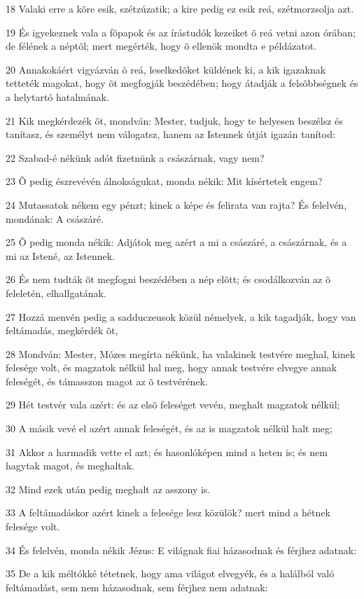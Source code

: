 \par 18 Valaki erre a kõre esik, szétzúzatik; a kire pedig ez esik reá, szétmorzsolja azt.
\par 19 És igyekeznek vala a fõpapok és az írástudók kezeiket õ reá vetni azon órában; de félének a néptõl; mert megérték, hogy õ ellenök mondta e példázatot.
\par 20 Annakokáért vigyázván õ reá, leselkedõket küldének ki, a kik igazaknak tetteték magokat, hogy õt megfogják beszédében; hogy átadják a felsõbbségnek és a helytartó hatalmának.
\par 21 Kik megkérdezék õt, mondván: Mester, tudjuk, hogy te helyesen beszélsz és tanítasz, és személyt nem válogatsz, hanem az Istennek útját igazán tanítod:
\par 22 Szabad-é nékünk adót fizetnünk a császárnak, vagy nem?
\par 23 Õ pedig észrevévén álnokságukat, monda nékik: Mit kísértetek engem?
\par 24 Mutassatok nékem egy pénzt; kinek a képe és felirata van rajta? És felelvén, mondának: A császáré.
\par 25 Õ pedig monda nékik: Adjátok meg azért a mi a császáré, a császárnak, és a mi az Istené, az Istennek.
\par 26 És nem tudták õt megfogni beszédében a nép elõtt; és csodálkozván az õ feleletén, elhallgatának.
\par 27 Hozzá menvén pedig a sadduczeusok közül némelyek, a kik tagadják, hogy van feltámadás, megkérdék õt,
\par 28 Mondván: Mester, Mózes megírta nékünk, ha valakinek testvére meghal, kinek felesége volt, és magzatok nélkül hal meg, hogy annak testvére elvegye annak feleségét, és támasszon magot az õ testvérének.
\par 29 Hét testvér vala azért: és az elsõ feleséget vevén, meghalt magzatok nélkül;
\par 30 A másik vevé el azért annak feleségét, és az is magzatok nélkül halt meg;
\par 31 Akkor a harmadik vette el azt; és hasonlóképen mind a heten is; és nem hagytak magot, és meghaltak.
\par 32 Mind ezek után pedig meghalt az asszony is.
\par 33 A feltámadáskor azért kinek a felesége lesz közülök? mert mind a hétnek felesége volt.
\par 34 És felelvén, monda nékik Jézus: E világnak fiai házasodnak és férjhez adatnak:
\par 35 De a kik méltókké tétetnek, hogy ama világot elvegyék, és a halálból való feltámadást, sem nem házasodnak, sem férjhez nem adatnak:
